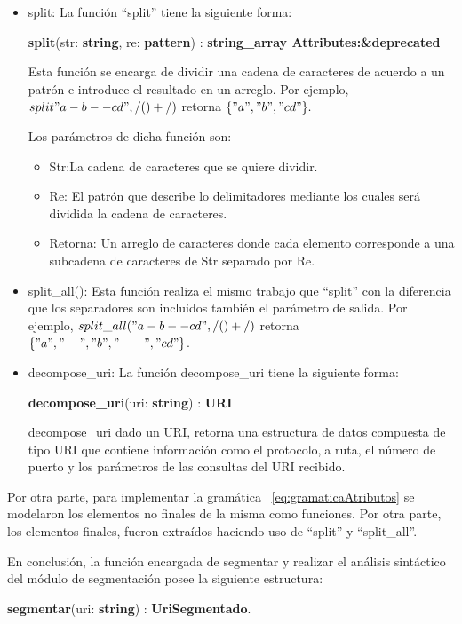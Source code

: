 \begin{itemize}
\item split:
La función ``split'' tiene la siguiente forma:

\textbf{split}(str: \textbf{string}, re: \textbf{pattern}) : \textbf{string\_array Attributes:\&deprecated}

Esta función se encarga de dividir una cadena de caracteres de acuerdo a un patrón e introduce el resultado en un arreglo. Por ejemplo, $split"a-b--cd", /(\-)+/)$ retorna $\{"a", "b", "cd"\}.$

Los parámetros de dicha función son:

\begin{itemize}
\item Str:La cadena de caracteres que se quiere dividir. 
\item Re: El patrón que describe lo delimitadores mediante los cuales será dividida la cadena de caracteres. 
\item Retorna: Un arreglo de caracteres donde cada elemento corresponde a una subcadena de caracteres de Str separado por Re.
\end{itemize}

\item split\_all():
Esta función realiza el mismo trabajo que ``split'' con la diferencia que los separadores son incluidos también el parámetro de salida.  Por ejemplo, $split\_all("a-b--cd", /(\-)+/)$ retorna $\{"a", "-", "b", "--", "cd"\}$.

\item decompose\_uri:
La función decompose\_uri tiene la siguiente forma:

\textbf{decompose\_uri}(uri: \textbf{string}) : \textbf{URI}

decompose\_uri dado un URI, retorna una estructura de datos compuesta de tipo URI que contiene información como el protocolo,la ruta, el número de puerto y los parámetros de las consultas del URI recibido.
\end{itemize}

Por otra parte, para implementar la gramática ~\ref{eq:gramaticaAtributos} se modelaron los elementos no finales de la misma como funciones. Por otra parte, los elementos finales, fueron extraídos haciendo uso de ``split'' y ``split\_all''.

En conclusión, la función encargada de segmentar y realizar el análisis sintáctico del módulo de segmentación posee la siguiente estructura:

\textbf{segmentar}(uri: \textbf{string}) : \textbf{UriSegmentado}.


